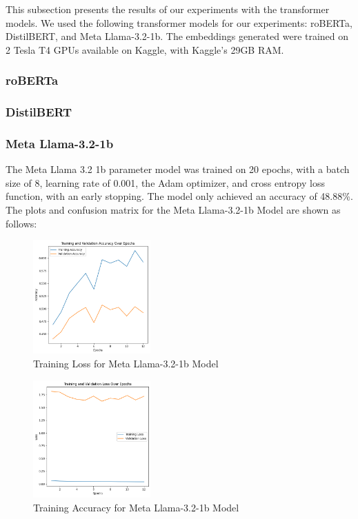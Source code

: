 This subsection presents the results of our experiments with the transformer models. We used the following transformer models for our experiments: roBERTa, DistilBERT, and Meta Llama-3.2-1b. The embeddings generated were trained on 2 Tesla T4 GPUs available on Kaggle, with Kaggle's 29GB RAM.

\subsubsection{roBERTa}

\subsubsection{DistilBERT}

\subsubsection{Meta Llama-3.2-1b}

The Meta Llama 3.2 1b parameter model was trained on 20 epochs, with a batch size of 8, learning rate of 0.001, the Adam optimizer, and cross entropy loss function, with an early stopping. The model only achieved an accuracy of 48.88\%. The plots and confusion matrix for the Meta Llama-3.2-1b Model are shown as follows:

\begin{figure}[H]
    \centering
    \includegraphics[width=0.4\textwidth]{llama_trainloss.png}
    \caption{Training Loss for Meta Llama-3.2-1b Model}
    \label{fig:llama_trainloss}
\end{figure}

\begin{figure}[H]
    \centering
    \includegraphics[width=0.4\textwidth]{llama_trainaccuracy.png}
    \caption{Training Accuracy for Meta Llama-3.2-1b Model}
    \label{fig:llama_trainaccuracy}
\end{figure}


